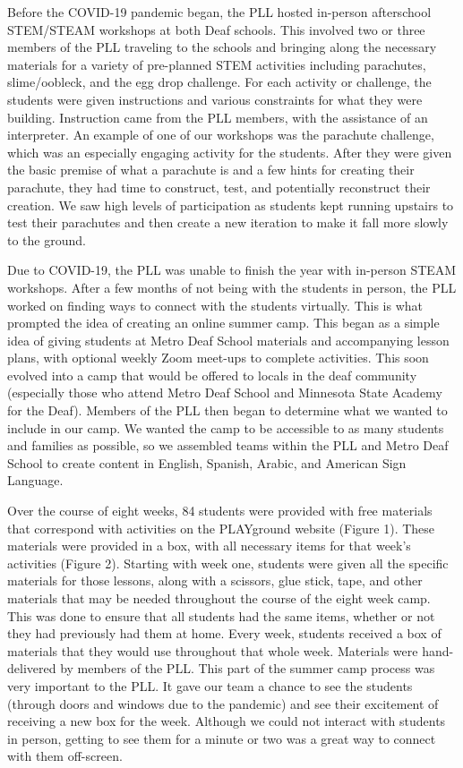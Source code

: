 \documentclass[11.5pt]{sig-alternate}
\begin{document}
\begin{large}
Before the COVID-19 pandemic began, the PLL hosted in-person afterschool STEM/STEAM workshops at both Deaf schools. This involved two or three members of the PLL traveling to the schools and bringing along the necessary materials for a variety of pre-planned STEM activities including parachutes, slime/oobleck, and the egg drop challenge. For each activity or challenge, the students were given instructions and various constraints for what they were building. Instruction came from the PLL members, with the assistance of an interpreter. An example of one of our workshops was the parachute challenge, which was an especially engaging activity for the students. After they were given the basic premise of what a parachute is and a few hints for creating their parachute, they had time to construct, test, and potentially reconstruct their creation. We saw high levels of participation as students kept running upstairs to test their parachutes and then create a new iteration to make it fall more slowly to the ground. 

Due to COVID-19, the PLL was unable to finish the year with in-person STEAM workshops. After a few months of not being with the students in person, the PLL worked on finding ways to connect with the students virtually. This is what prompted the idea of creating an online summer camp. This began as a simple idea of giving students at Metro Deaf School materials and accompanying lesson plans, with optional weekly Zoom meet-ups to complete activities. This soon evolved into a camp that would be offered to locals in the deaf community (especially those who attend Metro Deaf School and Minnesota State Academy for the Deaf). Members of the PLL then began to determine what we wanted to include in our camp. We wanted the camp to be accessible to as many students and families as possible, so we assembled teams within the PLL and Metro Deaf School to create content in English, Spanish, Arabic, and American Sign Language.

Over the course of eight weeks, 84 students were provided with free materials that correspond with activities on the PLAYground website (Figure 1). These materials were provided in a box, with all necessary items for that week’s activities (Figure 2). Starting with week one, students were given all the specific materials for those lessons, along with a scissors, glue stick, tape, and other materials that may be needed throughout the course of the eight week camp. This was done to ensure that all students had the same items, whether or not they had previously had them at home. Every week, students received a box of materials that they would use throughout that whole week. Materials were hand-delivered by members of the PLL. This part of the summer camp process was very important to the PLL. It gave our team a chance to see the students (through doors and windows due to the pandemic) and see their excitement of receiving a new box for the week. Although we could not interact with students in person, getting to see them for a minute or two was a great way to connect with them off-screen. 


\end{large}
\end{document}
